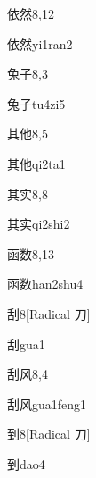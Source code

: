\begin{entry}{依然}{8,12}
  \begin{phonetics}{依然}{yi1ran2}
  \end{phonetics}
\end{entry}

\begin{entry}{兔子}{8,3}
  \begin{phonetics}{兔子}{tu4zi5}
  \end{phonetics}
\end{entry}

\begin{entry}{其他}{8,5}
  \begin{phonetics}{其他}{qi2ta1}
  \end{phonetics}
\end{entry}

\begin{entry}{其实}{8,8}
  \begin{phonetics}{其实}{qi2shi2}
  \end{phonetics}
\end{entry}

\begin{entry}{函数}{8,13}
  \begin{phonetics}{函数}{han2shu4}
  \end{phonetics}
\end{entry}

\begin{entry}{刮}{8}[Radical 刀]
  \begin{phonetics}{刮}{gua1}
  \end{phonetics}
\end{entry}

\begin{entry}{刮风}{8,4}
  \begin{phonetics}{刮风}{gua1feng1}
  \end{phonetics}
\end{entry}

\begin{entry}{到}{8}[Radical 刀]
  \begin{phonetics}{到}{dao4}
  \end{phonetics}
\end{entry}

